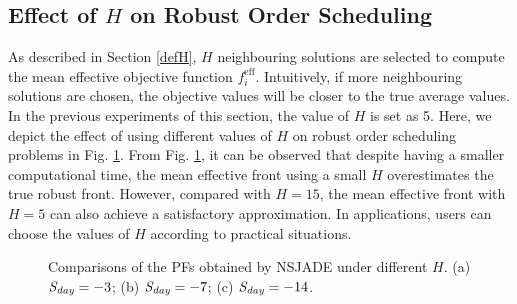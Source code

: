 \documentclass[journal]{IEEEtran}
\theoremstyle{definition}
\begin{document}
\subsection{Effect of $H$ on Robust Order Scheduling}
As described in Section \ref{defH}, $H$ neighbouring solutions are selected to compute the mean effective objective function $f_i^{\textrm{eff}}$. Intuitively, if more neighbouring solutions are chosen, the objective values will be closer to the true average values.
In the previous experiments of this section, the value of $H$ is set as 5. Here, we depict the effect of using different values of $H$ on robust order scheduling problems in Fig. \ref{figH15}. From Fig. \ref{figH15}, it can be observed that despite having a smaller computational time, the mean effective front using a small $H$ overestimates the true robust front. However, compared with $H=15$, the mean effective front with $H=5$ can also achieve a satisfactory approximation. In applications, users can choose the values of $H$ according to practical situations.
\begin{figure}
\centering
{}
\caption{Comparisons of the PFs obtained by NSJADE under different $H$. (a) $\emph{S}_\emph{day}=-3$; (b) $\emph{S}_\emph{day}=-7$; (c) $\emph{S}_\emph{day}=-14$.} \label{figH15}
\end{figure}
\end{document}
